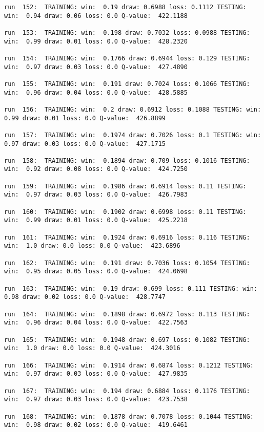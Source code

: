 \documentclass[11pt]{article}
\begin{document}
\begin{Verbatim}[commandchars=\\\{\}]
run  152:  TRAINING: win:  0.19 draw: 0.6988 loss: 0.1112 TESTING: win:  0.94 draw: 0.06 loss: 0.0 Q-value:  422.1188

run  153:  TRAINING: win:  0.198 draw: 0.7032 loss: 0.0988 TESTING: win:  0.99 draw: 0.01 loss: 0.0 Q-value:  428.2320

run  154:  TRAINING: win:  0.1766 draw: 0.6944 loss: 0.129 TESTING: win:  0.97 draw: 0.03 loss: 0.0 Q-value:  427.4890

run  155:  TRAINING: win:  0.191 draw: 0.7024 loss: 0.1066 TESTING: win:  0.96 draw: 0.04 loss: 0.0 Q-value:  428.5885

run  156:  TRAINING: win:  0.2 draw: 0.6912 loss: 0.1088 TESTING: win:  0.99 draw: 0.01 loss: 0.0 Q-value:  426.8899

run  157:  TRAINING: win:  0.1974 draw: 0.7026 loss: 0.1 TESTING: win:  0.97 draw: 0.03 loss: 0.0 Q-value:  427.1715

run  158:  TRAINING: win:  0.1894 draw: 0.709 loss: 0.1016 TESTING: win:  0.92 draw: 0.08 loss: 0.0 Q-value:  424.7250

run  159:  TRAINING: win:  0.1986 draw: 0.6914 loss: 0.11 TESTING: win:  0.97 draw: 0.03 loss: 0.0 Q-value:  426.7983

run  160:  TRAINING: win:  0.1902 draw: 0.6998 loss: 0.11 TESTING: win:  0.99 draw: 0.01 loss: 0.0 Q-value:  425.2218

run  161:  TRAINING: win:  0.1924 draw: 0.6916 loss: 0.116 TESTING: win:  1.0 draw: 0.0 loss: 0.0 Q-value:  423.6896

run  162:  TRAINING: win:  0.191 draw: 0.7036 loss: 0.1054 TESTING: win:  0.95 draw: 0.05 loss: 0.0 Q-value:  424.0698

run  163:  TRAINING: win:  0.19 draw: 0.699 loss: 0.111 TESTING: win:  0.98 draw: 0.02 loss: 0.0 Q-value:  428.7747

run  164:  TRAINING: win:  0.1898 draw: 0.6972 loss: 0.113 TESTING: win:  0.96 draw: 0.04 loss: 0.0 Q-value:  422.7563

run  165:  TRAINING: win:  0.1948 draw: 0.697 loss: 0.1082 TESTING: win:  1.0 draw: 0.0 loss: 0.0 Q-value:  424.3016

run  166:  TRAINING: win:  0.1914 draw: 0.6874 loss: 0.1212 TESTING: win:  0.97 draw: 0.03 loss: 0.0 Q-value:  427.9835

run  167:  TRAINING: win:  0.194 draw: 0.6884 loss: 0.1176 TESTING: win:  0.97 draw: 0.03 loss: 0.0 Q-value:  423.7538

run  168:  TRAINING: win:  0.1878 draw: 0.7078 loss: 0.1044 TESTING: win:  0.98 draw: 0.02 loss: 0.0 Q-value:  419.6461


\end{Verbatim}
\end{document}
